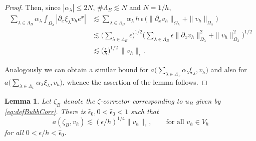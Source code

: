 \documentclass{article}
\newtheorem{lemma}[thm]{Lemma}
\newcommand{\summLA}[1][{}]{\ensuremath{\sum_{\lambda\in\Lambda_{#1}}\alpha_\lambda}}
\newcommand{\summL}[1][{}]{\ensuremath{\sum_{\lambda\in\Lambda_{#1}}}}
\begin{document}
\begin{proof}
Then, since $|\alpha_\lambda |\le 2N$, $\#\Lambda_B \lesssim N$ and $N = 1/h$,
$$
\begin{aligned}
   \summLA[B]\int_{\Omega_\lambda} |\partial_x \xi_\lambda v_h e^x|
    & \lesssim 
    \summLA[B] \, h \, \epsilon \, \big(\|\partial_x v_h \|_{\Omega_\lambda}  
           +\| v_h \|_{\Omega_\lambda}\big) \\   
   &\lesssim 
   \Big(\summL[B] \epsilon\Big)^{1/2} \Big(\summL[B]\epsilon \|\partial_x v_h \|_{\Omega_\lambda}^2 + \| v_h \|_{\Omega_\lambda}^2\Big)^{1/2}\\
   &\lesssim
   \Big(\frac\epsilon h\Big)^{1/2} \, \|v_h\|_\epsilon.
\end{aligned}
$$

Analogously we can obtain a similar bound for $a\Big(\summLA[T]\xi_\lambda,v_h\Big) $ and  also for $a\Big(\summLA[L]\xi_\lambda,v_h\Big) $, whence the assertion of the lemma follows.
\end{proof}

\begin{lemma}\label{Lemma:12}
Let $\zeta_B$ denote the $\zeta$-corrector corresponding to $u_B$ given by \eqref{eq:defBubbCorr}. There is $\hat{\epsilon}_0, 0 < \hat{\epsilon}_0 < 1$
such that
$$
 a(\zeta_B,v_h) \lesssim (\epsilon/h)^{1/4} \|v_h\|_\epsilon, \qquad \text{for all $v_h \in V_h$}
$$
for all $0<\epsilon/h <\hat{\epsilon}_0$.
\end{lemma}
\end{document}
